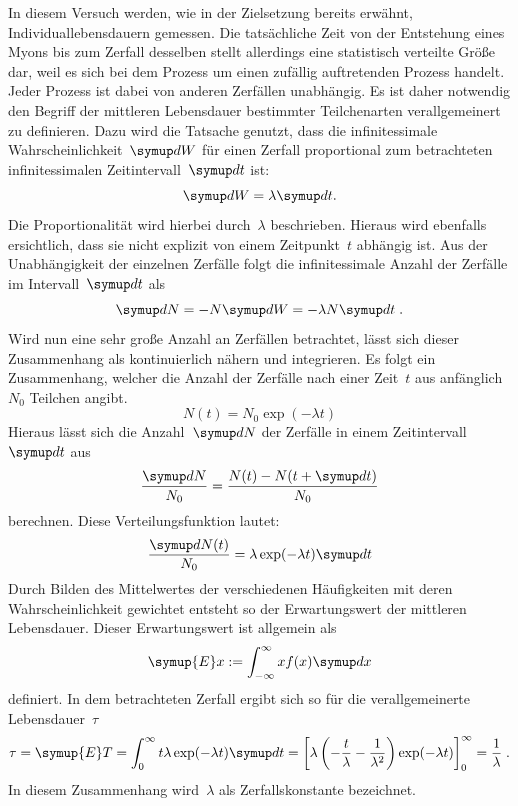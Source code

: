 In diesem Versuch werden, wie in der Zielsetzung bereits erwähnt,
Individuallebensdauern gemessen. Die tatsächliche Zeit von der Entstehung eines
Myons bis zum Zerfall desselben stellt allerdings eine statistisch verteilte
Größe dar, weil es sich bei dem Prozess um einen zufällig auftretenden Prozess
handelt. Jeder Prozess ist dabei von anderen Zerfällen unabhängig. Es ist daher
notwendig den Begriff der mittleren Lebensdauer bestimmter Teilchenarten
verallgemeinert zu definieren. Dazu wird die Tatsache genutzt, dass die
infinitessimale Wahrscheinlichkeit~$\upd W$ für einen Zerfall proportional zum
betrachteten infinitessimalen Zeitintervall~$\upd t$ ist:
%
\begin{equation}
  \upd W=\lambda\upd t.
\end{equation}
%
Die Proportionalität wird hierbei durch~$\lambda$ beschrieben. Hieraus wird
ebenfalls ersichtlich, dass sie nicht explizit von einem Zeitpunkt~$t$ abhängig
ist. Aus der Unabhängigkeit der einzelnen Zerfälle folgt die infinitessimale
Anzahl der Zerfälle im Intervall~$\upd t$ als
%
\begin{equation}
  \upd N=-N\upd W=-\lambda N\upd t \; .
\end{equation}
%
Wird nun eine sehr große Anzahl an Zerfällen betrachtet, lässt sich dieser
Zusammenhang als kontinuierlich nähern und integrieren. Es folgt ein
Zusammenhang, welcher die Anzahl der Zerfälle nach einer Zeit~$t$ aus
anfänglich~$N_0$ Teilchen angibt.
%
\begin{equation}
  N(t)=N_0\exp(-\lambda t)
\end{equation}
%
Hieraus lässt sich die Anzahl~$\upd N$ der Zerfälle in einem
Zeitintervall~$\upd t$ aus
%
\begin{equation}
  \frac{\upd N}{N_0}=\frac{N(t)-N(t+\upd t)}{N_0}
\end{equation}
%
berechnen. Diese Verteilungsfunktion lautet:
%
\begin{equation}
  \frac{\upd N(t)}{N_0}=\lambda\exp(-\lambda t)\upd t
\end{equation}
%
Durch Bilden des Mittelwertes der verschiedenen Häufigkeiten mit deren
Wahrscheinlichkeit gewichtet entsteht so der Erwartungswert der mittleren
Lebensdauer. Dieser Erwartungswert ist allgemein als
%
\begin{equation}
  \symup{E}x:=\int_{-\infty}^{\infty}xf(x)\upd x
\end{equation}
%
definiert. In dem betrachteten Zerfall ergibt sich so für die verallgemeinerte
Lebensdauer~$\tau$
%
\begin{equation}
  \tau=\symup{E}T=\int_0^\infty t\lambda\exp(-\lambda t)\upd t=\left[\lambda\left(-\frac{t}{\lambda}-\frac{1}{\lambda^2}\right)\exp(-\lambda t)\right]^\infty_0=\frac{1}{\lambda} \; .
\end{equation}
%
In diesem Zusammenhang wird~$\lambda$ als Zerfallskonstante bezeichnet.
